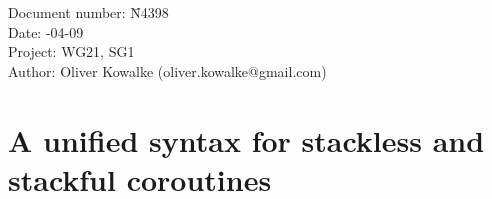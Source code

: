 \documentclass[paper=A4,pagesize,DIV=15]{scrartcl}
\begin{document}
\small
\begin{tabbing}
    Document number: \= N4398\\
    Date:            -04-09\\
    Project:         \> WG21, SG1\\
    Author:          \> Oliver Kowalke (oliver.kowalke@gmail.com)\\
\end{tabbing}

\section*{A unified syntax for stackless and stackful coroutines}


\tableofcontents













\end{document}
